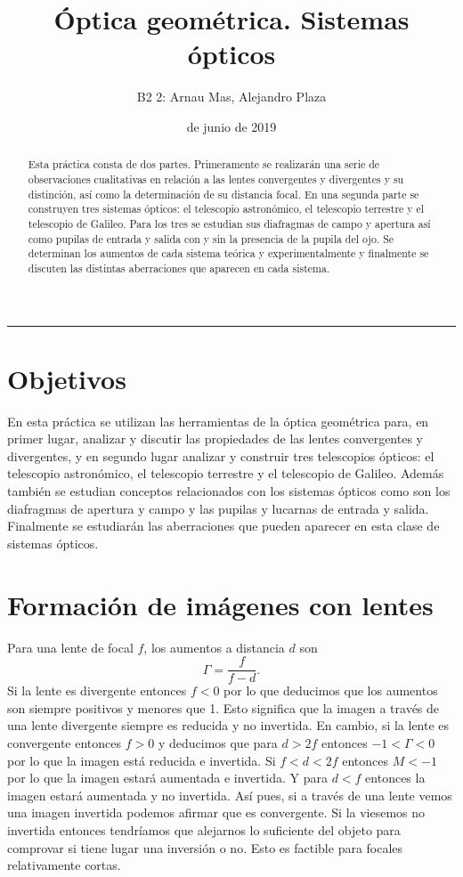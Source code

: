 \documentclass[12pt]{article}
\title{\sffamily {\bfseries Práctica 3:} Óptica geométrica. Sistemas ópticos }
\author{\sffamily B2 2: Arnau Mas, Alejandro Plaza}
\date{\sffamily 6 de junio de 2019}
\numberwithin{table}{section}
\numberwithin{figure}{section}
\numberwithin{equation}{section}
\begin{document}
\maketitle
\renewcommand{\abstractname}{\sffamily \bfseries Resumen:}
\begin{abstract}
	Esta práctica consta de dos partes. Primeramente se realizarán una serie de observaciones cualitativas en relación a las lentes convergentes y divergentes y su distinción, así como la determinación de su distancia focal. En una segunda parte se construyen tres sistemas ópticos: el telescopio astronómico, el telescopio terrestre y el telescopio de Galileo. Para los tres se estudian sus diafragmas de campo y apertura así como pupilas de entrada y salida con y sin la presencia de la pupila del ojo. Se determinan los aumentos de cada sistema teórica y experimentalmente y finalmente se discuten las distintas aberraciones que aparecen en cada sistema.
\end{abstract}
\hrule

\section{Objetivos}
En esta práctica se utilizan las herramientas de la óptica geométrica para, en primer lugar, analizar y discutir las propiedades de las lentes convergentes y divergentes, y en segundo lugar analizar y construir tres telescopios ópticos: el telescopio astronómico, el telescopio terrestre y el telescopio de Galileo. Además también se estudian conceptos relacionados con los sistemas ópticos como son los diafragmas de apertura y campo y las pupilas y lucarnas de entrada y salida. Finalmente se estudiarán las aberraciones que pueden aparecer en esta clase de sistemas ópticos.

\section{Formación de imágenes con lentes}
Para una lente de focal \( f \), los aumentos a distancia \( d \) son
\begin{equation*}
	\Gamma = \frac{f}{f - d}.
\end{equation*}
Si la lente es divergente entonces \( f < 0 \) por lo que deducimos que los aumentos son siempre positivos y menores que 1. Esto significa que la imagen a través de una lente divergente siempre es reducida y no invertida. En cambio, si la lente es convergente entonces \( f > 0 \) y deducimos que para \( d > 2f \) entonces \( -1 < \Gamma < 0 \) por lo que la imagen está reducida e invertida. Si \( f < d < 2f \) entonces \( M  < -1 \) por lo que la imagen estará aumentada e invertida. Y para \( d < f \) entonces la imagen estará aumentada y no invertida. Así pues, si a través de una lente vemos una imagen invertida podemos afirmar que es convergente. Si la viesemos no invertida entonces tendríamos que alejarnos lo suficiente del objeto para comprovar si tiene lugar una inversión o no. Esto es factible para focales relativamente cortas.    
\end{document}
